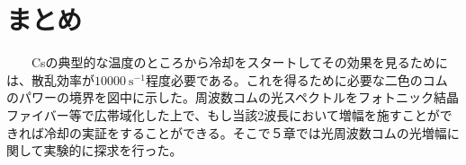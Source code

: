 \documentclass[uplatex, dvipdfmx, a4paper, report, papersize, 11pt]{jsbook}
\begin{document}
\section{まとめ}
　　Csの典型的な温度のところから冷却をスタートしてその効果を見るためには、散乱効率が$10000\ \mathrm{s^{-1}}$程度必要である。これを得るために必要な二色のコムのパワーの境界を図中に示した。周波数コムの光スペクトルをフォトニック結晶ファイバー等で広帯域化した上で、もし当該2波長において増幅を施すことができれば冷却の実証をすることができる。そこで５章では光周波数コムの光増幅に関して実験的に探求を行った。

\end{document}
